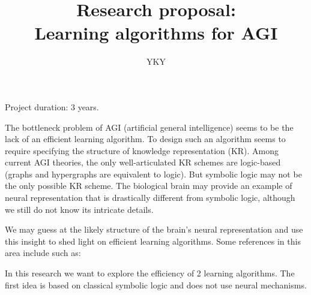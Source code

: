 

\usepackage{xeCJK}
\usepackage{color}
\usepackage{hyperref}
\usepackage{mathtools}



\title{{\small Research proposal:} \\ Learning algorithms for AGI}
\author{YKY}


\maketitle

Project duration: 3 years.

The bottleneck problem of AGI (artificial general intelligence) \parencite{Goertzel2007} seems to be the lack of an efficient learning algorithm.  To design such an algorithm seems to require specifying the structure of knowledge representation (KR).  Among current AGI theories, the only well-articulated KR schemes are logic-based (graphs and hypergraphs are equivalent to logic).  But symbolic logic may not be the only possible KR scheme.  The biological brain may provide an example of neural representation that is drastically different from symbolic logic, although we still do not know its intricate details.

We may guess at the likely structure of the brain's neural representation and use this insight to shed light on efficient learning algorithms.  Some references in this area include such as: \cite{Smolensky2006}

In this research we want to explore the efficiency of 2 learning algorithms.  The first idea is based on classical symbolic logic and does not use neural mechanisms.

